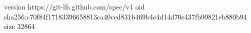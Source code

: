 version https://git-lfs.github.com/spec/v1
oid sha256:c70f84f17183396658813ca40ced831b469b4e4d14d70e437fb90821eb880b94
size 32864
